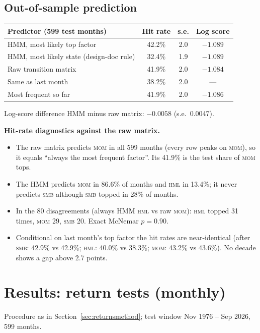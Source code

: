 \documentclass[11pt]{article}
\newcommand{\SMB}{\textsc{smb}}
\newcommand{\HML}{\textsc{hml}}
\newcommand{\MOM}{\textsc{mom}}
\begin{document}
\subsection{Out-of-sample prediction}
\begin{center}
\begin{tabular}{lccc}
\toprule
Predictor (599 test months) & Hit rate & s.e. & Log score \\
\midrule
HMM, most likely top factor & 42.2\% & 2.0 & $-1.089$ \\
HMM, most likely state (design-doc rule) & 32.4\% & 1.9 & $-1.089$ \\
Raw transition matrix & 41.9\% & 2.0 & $-1.084$ \\
Same as last month & 38.2\% & 2.0 & --- \\
Most frequent so far & 41.9\% & 2.0 & $-1.086$ \\
\bottomrule
\end{tabular}
\end{center}
Log-score difference HMM minus raw matrix: $-0.0058$ (s.e.\ 0.0047).

\textbf{Hit-rate diagnostics against the raw matrix.}
\begin{itemize}
\item The raw matrix predicts \MOM{} in all 599 months (every row peaks on \MOM), so it equals ``always the most frequent factor''. Its 41.9\% is the test share of \MOM{} tops.
\item The HMM predicts \MOM{} in 86.6\% of months and \HML{} in 13.4\%; it never predicts \SMB{} although \SMB{} topped in 28\% of months.
\item In the 80 disagreements (always HMM \HML{} vs raw \MOM): \HML{} topped 31 times, \MOM{} 29, \SMB{} 20. Exact McNemar $p=0.90$.
\item Conditional on last month's top factor the hit rates are near-identical (after \SMB: 42.9\% vs 42.9\%; \HML: 40.0\% vs 38.3\%; \MOM: 43.2\% vs 43.6\%). No decade shows a gap above 2.7 points.
\end{itemize}

\section{Results: return tests (monthly)}\label{sec:returns}

Procedure as in Section~\ref{sec:returnsmethod}; test window Nov 1976 -- Sep 2026, 599 months.
\end{document}
